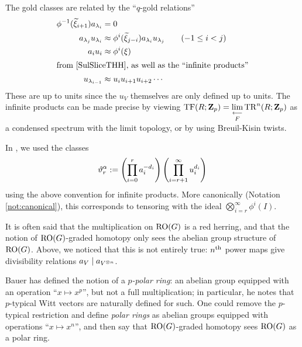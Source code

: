\begin{notation}
  The gold classes are related by the ``$q$-gold relations''
  \begin{alignat*}{2}
    \phi^{-1}(\~\xi_{i+1})a_{\lambda_i} &= 0\\
    a_{\lambda_j} u_{\lambda_i} &\approx \phi^i(\~\xi_{j-i}) a_{\lambda_i} u_{\lambda_j} &\quad& (-1\le i<j)\\
    a_i u_i &\approx \phi^i(\xi)\\
    \intertext{from \cite[Lemma 4.9]{SulSliceTHH}, as well as the ``infinite products''}
    u_{\lambda_{i-1}} &\approx u_i u_{i+1} u_{i+2} \dotsm
  \end{alignat*}
  These are up to units since the $u_V$ themselves are only defined up to units. The infinite products can be made precise by viewing $\mathrm{TF}(R;\mathbf Z_p) = \mathop{\operatorname*{lim}\limits_{\longleftarrow}}\limits_F \mathrm{TR}^n(R;\mathbf Z_p)$ as a condensed spectrum with the limit topology, or by using Breuil-Kisin twists.

  In \cite{SulROGTHH}, we used the classes
  \[ \vartheta^\alpha_r \mathrel{:=} \left(\prod_{i=0}^r a_i^{-d_i}\right)\left(\prod_{i=r+1}^\infty u_i^{d_i}\right) \]
  using the above convention for infinite products. More canonically (Notation \ref{not:canonical}), this corresponds to tensoring with the ideal $\bigotimes_{i=r}^\infty \phi^{i}(I)$.
\end{notation}

\begin{remark}
  It is often said that the multiplication on $\operatorname{RO}(G)$ is a red herring, and that the notion of $\operatorname{RO}(G)$-graded homotopy only sees the abelian group structure of $\operatorname{RO}(G)$. Above, we noticed that this is not entirely true: $n^{\mathrm{th}}$ power maps give divisibility relations $a_V \mid a_{V^{\otimes n}}$.

  Bauer \cite{BauerPolar} has defined the notion of a \emph{$p$-polar ring}: an abelian group equipped with an operation ``$x\mapsto x^p$'', but not a full multiplication; in particular, he notes that $p$-typical Witt vectors are naturally defined for such. One could remove the $p$-typical restriction and define \emph{polar rings} as abelian groups equipped with operations ``$x\mapsto x^n$'', and then say that $\operatorname{RO}(G)$-graded homotopy sees $\operatorname{RO}(G)$ as a polar ring.
\end{remark}

